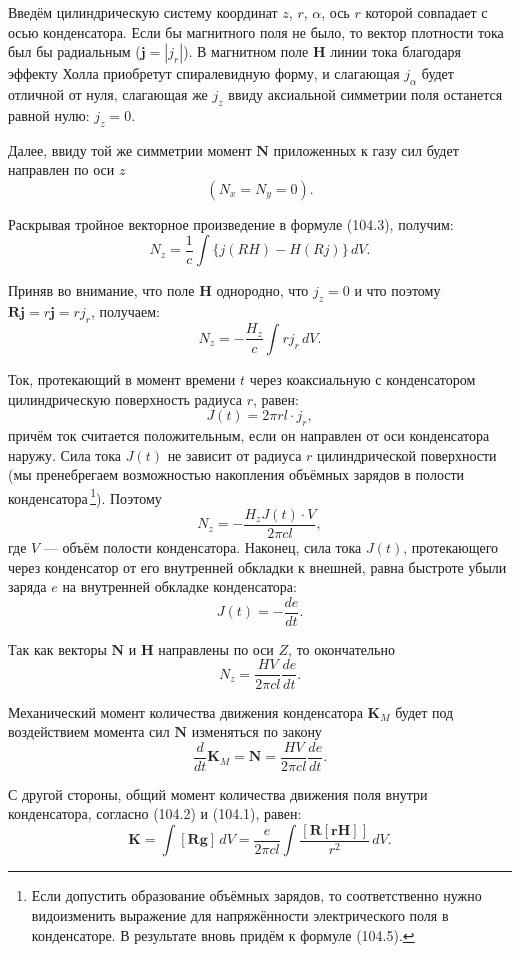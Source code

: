 \documentclass[a4paper,12pt]{article}
\begin{document}
Введём цилиндрическую систему координат $z$, $r$, $\alpha$, ось $r$
которой совпадает с осью конденсатора. Если бы магнитного поля не было,
то вектор плотности тока был бы радиальным ($\mathbf{j} = |j_r|$).
В магнитном поле $\mathbf{H}$ линии тока благодаря эффекту Холла
приобретут спиралевидную форму, и слагающая $j_\alpha$ будет отличной
от нуля, слагающая же $j_z$ ввиду аксиальной симметрии поля останется
равной нулю: $j_z = 0$.

Далее, ввиду той же симметрии момент $\mathbf{N}$ приложенных к газу
сил будет направлен по оси $z$
$$
    (N_x = N_y = 0).
$$

Раскрывая тройное векторное произведение в формуле (104.3), получим:
$$
    N_z = \frac{1}{c}\int\{j(RH) - H(Rj)\}\,dV.
$$

Приняв во внимание, что поле $\mathbf{H}$ однородно, что $j_z = 0$
и что поэтому $\mathbf{R}\mathbf{j} = r\mathbf{j} = rj_r$, получаем:
$$
    N_z = -\frac{H_z}{c}\int rj_r\,dV.
$$


Ток, протекающий в момент времени $t$ через коаксиальную с конденсатором
цилиндрическую поверхность радиуса $r$, равен:
$$
    J(t) = 2\pi r l\cdot j_r,
$$
причём ток считается положительным, если он направлен от оси конденсатора
наружу. Сила тока $J(t)$ не зависит от радиуса $r$ цилиндрической
поверхности (мы пренебрегаем возможностью накопления объёмных зарядов
в полости конденсатора\,\footnote{Если допустить образование объёмных
зарядов, то соответственно нужно видоизменить выражение для напряжённости
электрического поля в конденсаторе. В результате вновь придём к формуле
(104.5).}). Поэтому
$$
    N_z = -\frac{H_z J(t)\cdot V}{2\pi cl},
$$
где $V$ — объём полости конденсатора. Наконец, сила тока $J(t)$,
протекающего через конденсатор от его внутренней обкладки к внешней,
равна быстроте убыли заряда $e$ на внутренней обкладке конденсатора:
$$
    J(t) = -\frac{de}{dt}.
$$

Так как векторы $\mathbf{N}$ и $\mathbf{H}$ направлены по оси $Z$, то
окончательно
$$
    N_z = \frac{HV}{2\pi cl}\frac{de}{dt}.
$$

Механический момент количества движения конденсатора $\mathbf{K}_M$
будет под воздействием момента сил $\mathbf{N}$ изменяться по закону
\begin{equation}
    \frac{d}{dt}\mathbf{K}_M = \mathbf{N} = \frac{HV}{2\pi cl}\frac{de}{dt}.
    \tag{104.4}
\end{equation}

С другой стороны, общий момент количества движения поля внутри
конденсатора, согласно (104.2) и (104.1), равен:
$$
    \mathbf{K} = \int[\mathbf{R}\mathbf{g}]\,dV
              = \frac{e}{2\pi cl}\int\frac{[\mathbf{R}[\mathbf{r}\mathbf{H}]]}{r^2}\,dV.
$$
\end{document}
